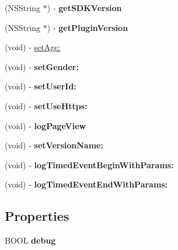 \begin{DoxyCompactItemize}
\mbox{\label{interfaceAnalyticsFlurry_a245d08082d1fc44777af2ba1a507e171}} 
(N\+S\+String $\ast$) -\/ {\bfseries get\+S\+D\+K\+Version}
\item 
\mbox{\label{interfaceAnalyticsFlurry_abea222223e0d942031de2f04f1631f02}} 
(N\+S\+String $\ast$) -\/ {\bfseries get\+Plugin\+Version}
\item 
(void) -\/ \hyperlink{interfaceAnalyticsFlurry_aeb72cbaba6537c4e6a886fef638dbc03}{set\+Age\+:}
\item 
\mbox{\label{interfaceAnalyticsFlurry_aa631065a6ba17109fc2e0516b0ed7869}} 
(void) -\/ {\bfseries set\+Gender\+:}
\item 
\mbox{\label{interfaceAnalyticsFlurry_aa6196257100240c7e2b6b3d762cf8150}} 
(void) -\/ {\bfseries set\+User\+Id\+:}
\item 
\mbox{\label{interfaceAnalyticsFlurry_a37e118e1c976ddcc5f44c5b536f72013}} 
(void) -\/ {\bfseries set\+Use\+Https\+:}
\item 
\mbox{\label{interfaceAnalyticsFlurry_aee4f31e35ec32cabfa17aaa04623249e}} 
(void) -\/ {\bfseries log\+Page\+View}
\item 
\mbox{\label{interfaceAnalyticsFlurry_a2446c5f7ebd87dfdbd4dfd722a826eb1}} 
(void) -\/ {\bfseries set\+Version\+Name\+:}
\item 
\mbox{\label{interfaceAnalyticsFlurry_af17c6e823d5c009e7ad02698c003bd03}} 
(void) -\/ {\bfseries log\+Timed\+Event\+Begin\+With\+Params\+:}
\item 
\mbox{\label{interfaceAnalyticsFlurry_abd0bf199616990603f2df2eaed4dc721}} 
(void) -\/ {\bfseries log\+Timed\+Event\+End\+With\+Params\+:}
\end{DoxyCompactItemize}
\subsection*{Properties}
\begin{DoxyCompactItemize}
\item 
\mbox{\label{interfaceAnalyticsFlurry_aec791323b870a6d6a1a7afc96d6d4fa7}} 
B\+O\+OL {\bfseries debug}
\end{DoxyCompactItemize}


